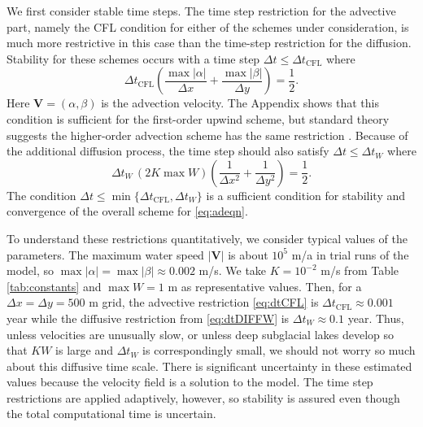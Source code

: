 \documentclass[11pt,final]{amsart}%
\newcommand\bV{\mathbf{V}}
\begin{document}
We first consider stable time steps.  The time step restriction for the advective part, namely the CFL condition for either of the schemes under consideration, is much more restrictive in this case than the time-step restriction for the diffusion.  Stability for these schemes occurs with a time step $\Delta t \le \Delta t_{\text{CFL}}$ where
\begin{equation}
\Delta t_{\text{CFL}} \left(\frac{\max |\alpha|}{\Delta x} + \frac{\max |\beta|}{\Delta y}\right) = \frac{1}{2}. \label{eq:dtCFL}
\end{equation}
Here $\bV=(\alpha,\beta)$ is the advection velocity.  The Appendix shows that this condition is sufficient for the first-order upwind scheme, but standard theory suggests the higher-order advection scheme has the same restriction \citep{HundsdorferVerwer2010}.  Because of the additional diffusion process, the time step should also satisfy $\Delta t \le \Delta t_{W}$ \citep{MortonMayers} where
\begin{equation}
\Delta t_W\, (2 K \max W) \left(\frac{1}{\Delta x^2} + \frac{1}{\Delta y^2}\right) = \frac{1}{2}. \label{eq:dtDIFFW}
\end{equation}
The condition $\Delta t \le \min\{\Delta t_{\text{CFL}}, \Delta t_W\}$ is a sufficient condition for stability and convergence of the overall scheme for \eqref{eq:adeqn}.

To understand these restrictions quantitatively, we consider typical values of the parameters.  The maximum water speed $|\bV|$ is about $10^5$ m/a in trial runs of the model, so $\max |\alpha| = \max |\beta| \approx 0.002$ m/s.  We take $K=10^{-2}$ m/s from Table \ref{tab:constants} and $\max W=1$ m as representative values.  Then, for a $\Delta x = \Delta y = 500$ m grid, the advective restriction \eqref{eq:dtCFL} is $\Delta t_{\text{CFL}} \approx 0.001$ year while the diffusive restriction from \eqref{eq:dtDIFFW} is $\Delta t_W \approx 0.1$ year.  Thus, unless velocities are unusually slow, or unless deep subglacial lakes develop so that $KW$ is large and $\Delta t_W$ is correspondingly small, we should not worry so much about this diffusive time scale.  There is significant uncertainty in these estimated values because the velocity field is a solution to the model.  The time step restrictions are applied adaptively, however, so stability is assured even though the total computational time is uncertain.
\end{document}
